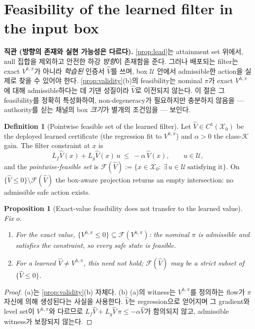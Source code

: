 \documentclass[11pt]{article}
\theoremstyle{plain}
\newtheorem{proposition}[theorem]{Proposition}
\theoremstyle{definition}
\newtheorem{definition}[theorem]{Definition}
\theoremstyle{remark}
\newcommand{\calX}{\mathcal{X}}
\newcommand{\calU}{\mathcal{U}}
\newcommand{\calK}{\mathcal{K}}
\newcommand{\Vhp}[1]{V^{h,#1}}
\newcommand{\Vhpi}{\Vhp{\pi}}
\newcommand{\Vhat}{\widehat V}
\newcommand{\Lg}{L_g}
\newcommand{\Lf}{L_f}
\newcommand{\eqdef}{:=}
\begin{document}
\section{Feasibility of the learned filter in the input box}\label{sec:feasibility}

\textbf{직관 (방향의 존재와 실현 가능성은 다르다).}
\cref{prop:lead}는 attainment set 위에서, null 집합을 제외하고 안전한 하강 \emph{방향}이 존재함을
준다. 그러나 배포되는 filter는 exact $\Vhpi$가 아니라 \emph{학습된} 인증서 $\Vhat$를 쓰며, box
$\calU$ 안에서 admissible한 action을 실제로 찾을 수 있어야 한다. \cref{prop:validity}(b)의
feasibility는 nominal $\pi$가 exact $\Vhpi$에 대해 admissible하다는 데 기댄 성질이라 $\Vhat$로
이전되지 않는다. 이 절은 그 feasibility를 정확히 특성화하여, non-degeneracy가 필요하지만 충분하지
않음을 --- authority를 싣는 채널의 box \emph{크기}가 별개의 조건임을 --- 보인다.

\begin{definition}[Pointwise feasible set of the learned filter]\label{def:feas}
Let $\Vhat\in C^1(\calX_0)$ be the deployed learned certificate (the regression fit to $\Vhpi$)
and $\alpha>0$ the class-$\calK$ gain. The filter constraint at $x$ is
\begin{equation}
\Lf\Vhat(x)+\Lg\Vhat(x)\,u\ \le\ -\alpha\,\Vhat(x),\qquad u\in\calU,
\end{equation}
and the \emph{pointwise-feasible set} is
$\mathcal F(\Vhat)\eqdef\{x\in\calX_0:\ \exists\,u\in\calU\ \text{satisfying it}\}$. On
$\{\Vhat\le0\}\setminus\mathcal F(\Vhat)$ the box-aware projection returns an empty
intersection: no admissible safe action exists.
\end{definition}

\begin{proposition}[Exact-value feasibility does not transfer to the learned value]\label{prop:transfer-feas}
Fix $o$.
\begin{enumerate}[label=(\alph*)]
  \item For the exact value, $\{\Vhpi\le0\}\subseteq\mathcal F(\Vhpi)$: the nominal $\pi$ is admissible and satisfies the constraint, so every safe state is feasible.
  \item For a learned $\Vhat\neq\Vhpi$, this need not hold; $\mathcal F(\Vhat)$ may be a strict subset of $\{\Vhat\le0\}$.
\end{enumerate}
\end{proposition}
\begin{proof}
(a)는 \cref{prop:validity}(b) 자체다. (b) (a)의 witness는 $\Vhpi$를 정의하는 flow가 $\pi$ 자신에
의해 생성된다는 사실을 사용한다. $\Vhat$는 regression으로 얻어지며 그 gradient와 level set이
$\Vhpi$와 다르므로 $\Lf\Vhat+\Lg\Vhat\,\pi\le-\alpha\Vhat$가 함의되지 않고, admissible witness가
보장되지 않는다.
\end{proof}
\end{document}
